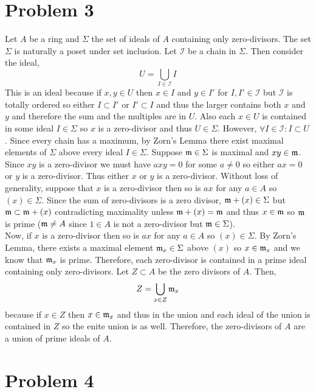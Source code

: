 \documentclass[12pt]{extarticle}
\begin{document}
\section{Problem 3}

Let $A$ be a ring and $\Sigma$ the set of ideals of $A$ containing only zero-divisors. The set $\Sigma$ is naturally a poset under set inclusion. Let $\mathcal{I}$ be a chain in $\Sigma$. Then consider the ideal,
\[ U = \bigcup_{I \in \mathcal{I}} I \]
This is an ideal because if $x, y \in U$ then $x \in I$ and $y \in I'$ for $I, I' \in \mathcal{I}$ but $\mathcal{I}$ is totally ordered so either $I \subset I'$ or $I' \subset I$ and thus the larger contains both $x$ and $y$ and therefore the sum and the multiples are in $U$. Also each $x \in U$ is contained in some ideal $I \in \Sigma$ so $x$ is a zero-divisor and thus $U \in \Sigma$. However, $\forall I \in \mathcal{I} : I \subset U$. Since every chain has a maximum, by Zorn's Lemma there exist maximal elements of $\Sigma$ above every ideal $I \in \Sigma$. Suppose $\mathfrak{m} \in \Sigma$ is maximal and $xy \in \mathfrak{m}$. Since $xy$ is a zero-divisor we must have $a xy = 0$ for some $a \neq 0$ so either $ax = 0$ or $y$ is a zero-divisor. Thus either $x$ or $y$ is a zero-divisor. Without loss of generality, suppose that $x$ is a zero-divisor then so is $ax$ for any $a \in A$ so $(x) \in \Sigma$. Since the sum of zero-divisors is a zero divisor, $\mathfrak{m} + (x) \in \Sigma$ but $\mathfrak{m} \subset \mathfrak{m} + (x)$ contradicting maximality unless $\mathfrak{m} + (x) = \mathfrak{m}$ and thus $x \in \mathfrak{m}$ so $\mathfrak{m}$ is prime ($\mathfrak{m} \neq A$ since $1 \in A$ is not a zero-divisor but $\mathfrak{m} \in \Sigma$). 
\bigskip\\
Now, if $x$ is a zero-divisor then so is $ax$ for any $a \in A$ so $(x) \in \Sigma$. By Zorn's Lemma, there exists a maximal element $\mathfrak{m}_x \in \Sigma$ above $(x)$ so $x \in \mathfrak{m}_x$ and we know that $\mathfrak{m}_x$ is prime. Therefore, each zero-divisor is contained in a prime ideal containing only zero-divisors. Let $Z \subset A$ be the zero divisors of $A$. Then,
\[ Z = \bigcup_{x \in Z} \mathfrak{m}_x \]
because if $x \in Z$ then $x \in \mathfrak{m}_x$ and thus in the union and each ideal of the union is contained in $Z$ so the enite union is as well. Therefore, the zero-divisors of $A$ are a union of prime ideals of $A$. 

\section{Problem 4}
\end{document}
